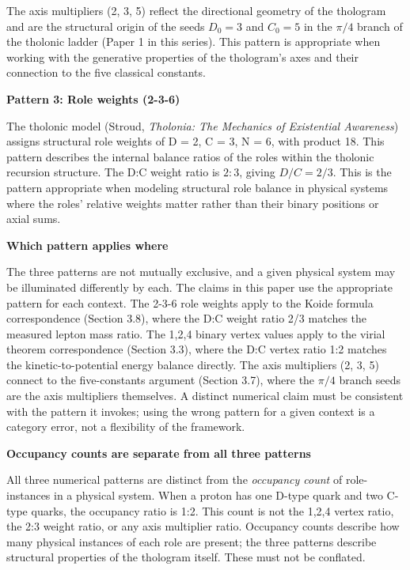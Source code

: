 \documentclass[12pt]{article}
\begin{document}
The axis multipliers (2, 3, 5) reflect the directional geometry of the
thologram and are the structural origin of the seeds \(D_0 = 3\) and
\(C_0 = 5\) in the \(\pi/4\) branch of the tholonic ladder (Paper 1 in
this series). This pattern is appropriate when working with the
generative properties of the thologram's axes and their connection to
the five classical constants.

\textbf{Pattern 3: Role weights (2-3-6)}

The tholonic model (Stroud, \emph{Tholonia: The Mechanics of Existential
Awareness}) assigns structural role weights of D = 2, C = 3, N = 6, with
product 18. This pattern describes the internal balance ratios of the
roles within the tholonic recursion structure. The D:C weight ratio is
\(2:3\), giving \(D/C = 2/3\). This is the pattern appropriate when
modeling structural role balance in physical systems where the roles'
relative weights matter rather than their binary positions or axial
sums.

\textbf{Which pattern applies where}

The three patterns are not mutually exclusive, and a given physical
system may be illuminated differently by each. The claims in this paper
use the appropriate pattern for each context. The 2-3-6 role weights
apply to the Koide formula correspondence (Section 3.8), where the D:C
weight ratio 2/3 matches the measured lepton mass ratio. The 1,2,4
binary vertex values apply to the virial theorem correspondence (Section
3.3), where the D:C vertex ratio 1:2 matches the kinetic-to-potential
energy balance directly. The axis multipliers (2, 3, 5) connect to the
five-constants argument (Section 3.7), where the \(\pi/4\) branch seeds
are the axis multipliers themselves. A distinct numerical claim must be
consistent with the pattern it invokes; using the wrong pattern for a
given context is a category error, not a flexibility of the framework.

\textbf{Occupancy counts are separate from all three patterns}

All three numerical patterns are distinct from the \emph{occupancy
count} of role-instances in a physical system. When a proton has one
D-type quark and two C-type quarks, the occupancy ratio is 1:2. This
count is not the 1,2,4 vertex ratio, the 2:3 weight ratio, or any axis
multiplier ratio. Occupancy counts describe how many physical instances
of each role are present; the three patterns describe structural
properties of the thologram itself. These must not be conflated.
\end{document}
